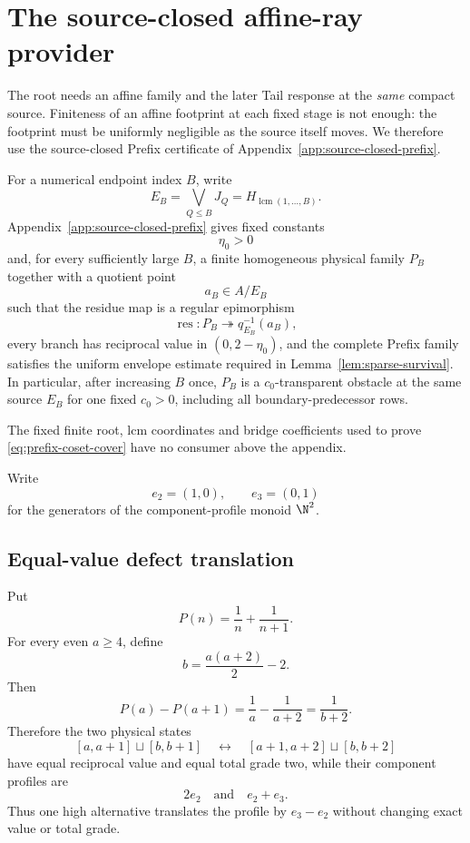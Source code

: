 
\section{The source-closed affine-ray provider}
\label{sec:affine-provider}

The root needs an affine family and the later Tail response at the \emph{same}
compact source.  Finiteness of an affine footprint at each fixed stage is not
enough: the footprint must be uniformly negligible as the source itself moves.
We therefore use the source-closed Prefix certificate of
Appendix~\ref{app:source-closed-prefix}.

For a numerical endpoint index $B$, write
\[
E_B=\bigvee_{Q\le B}J_Q
=H_{\operatorname{lcm}(1,\ldots,B)}.
\]
Appendix~\ref{app:source-closed-prefix} gives fixed constants
\[
\eta_0>0
\]
and, for every sufficiently large $B$, a finite homogeneous physical family
$P_B$ together with a quotient point
\[
a_B\in A/E_B
\]
such that the residue map is a regular epimorphism
\[
\operatorname{res}:P_B\twoheadrightarrow q_{E_B}^{-1}(a_B),
\tag{A0}\label{eq:prefix-coset-cover}
\]
every branch has reciprocal value in $(0,2-\eta_0)$, and the complete Prefix
family satisfies the uniform envelope estimate required in
Lemma~\ref{lem:sparse-survival}.  In particular, after increasing $B$ once,
$P_B$ is a $c_0$-transparent obstacle at the same source $E_B$ for one fixed
$c_0>0$, including all boundary-predecessor rows.

The fixed finite root, lcm coordinates and bridge coefficients used to prove
\eqref{eq:prefix-coset-cover} have no consumer above the appendix.

Write
\[
e_2=(1,0),
\qquad
e_3=(0,1)
\]
for the generators of the component-profile monoid $\N^2$.

\subsection{Equal-value defect translation}

Put
\[
P(n)=\frac1n+\frac1{n+1}.
\]
For every even $a\ge4$, define
\[
b=\frac{a(a+2)}2-2.
\]
Then
\[
P(a)-P(a+1)
=
\frac1a-\frac1{a+2}
=
\frac1{b+2}.
\]
Therefore the two physical states
\[
[a,a+1]\sqcup[b,b+1]
\quad\longleftrightarrow\quad
[a+1,a+2]\sqcup[b,b+2]
\tag{A1}\label{eq:defect-switch}
\]
have equal reciprocal value and equal total grade two, while their component
profiles are
\[
2e_2
\quad\text{and}\quad
e_2+e_3.
\]
Thus one high alternative translates the profile by $e_3-e_2$ without
changing exact value or total grade.

